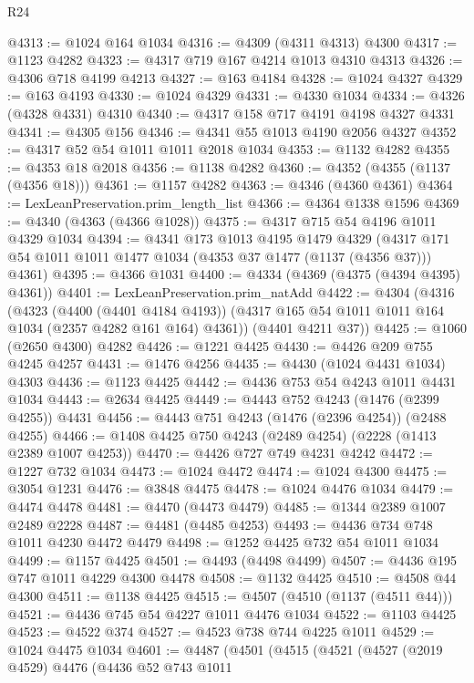 \begin{lexlean}{R24}
\begin{coremodule}
@4313 := @1024 @164 @1034
@4316 := @4309 (@4311 @4313) @4300
@4317 := @1123 @4282
@4323 := @4317 @719 @167 @4214 @1013 @4310 @4313
@4326 := @4306 @718 @4199 @4213
@4327 := @163 @4184
@4328 := @1024 @4327
@4329 := @163 @4193
@4330 := @1024 @4329
@4331 := @4330 @1034
@4334 := @4326 (@4328 @4331) @4310
@4340 := @4317 @158 @717 @4191 @4198 @4327 @4331
@4341 := @4305 @156
@4346 := @4341 @55 @1013 @4190 @2056 @4327
@4352 := @4317 @52 @54 @1011 @1011 @2018 @1034
@4353 := @1132 @4282
@4355 := @4353 @18 @2018
@4356 := @1138 @4282
@4360 := @4352 (@4355 (@1137 (@4356 @18)))
@4361 := @1157 @4282
@4363 := @4346 (@4360 @4361)
@4364 := LexLeanPreservation.prim_length_list
@4366 := @4364 @1338 @1596
@4369 := @4340 (@4363 (@4366 @1028))
@4375 := @4317 @715 @54 @4196 @1011 @4329 @1034
@4394 := @4341
    @173
    @1013
    @4195
    @1479
    @4329
    (@4317 @171 @54 @1011 @1011 @1477 @1034 (@4353 @37 @1477 (@1137 (@4356 @37))) @4361)
@4395 := @4366 @1031
@4400 := @4334 (@4369 (@4375 (@4394 @4395) @4361))
@4401 := LexLeanPreservation.prim_natAdd
@4422 := @4304
    (@4316
      (@4323
        (@4400 (@4401 @4184 @4193))
        (@4317 @165 @54 @1011 @1011 @164 @1034 (@2357 @4282 @161 @164) @4361))
      (@4401 @4211 @37))
@4425 := @1060 (@2650 @4300) @4282
@4426 := @1221 @4425
@4430 := @4426 @209 @755 @4245 @4257
@4431 := @1476 @4256
@4435 := @4430 (@1024 @4431 @1034) @4303
@4436 := @1123 @4425
@4442 := @4436 @753 @54 @4243 @1011 @4431 @1034
@4443 := @2634 @4425
@4449 := @4443 @752 @4243 (@1476 (@2399 @4255)) @4431
@4456 := @4443 @751 @4243 (@1476 (@2396 @4254)) (@2488 @4255)
@4466 := @1408 @4425 @750 @4243 (@2489 @4254) (@2228 (@1413 @2389 @1007 @4253))
@4470 := @4426 @727 @749 @4231 @4242
@4472 := @1227 @732 @1034
@4473 := @1024 @4472
@4474 := @1024 @4300
@4475 := @3054 @1231
@4476 := @3848 @4475
@4478 := @1024 @4476 @1034
@4479 := @4474 @4478
@4481 := @4470 (@4473 @4479)
@4485 := @1344 @2389 @1007 @2489 @2228
@4487 := @4481 (@4485 @4253)
@4493 := @4436 @734 @748 @1011 @4230 @4472 @4479
@4498 := @1252 @4425 @732 @54 @1011 @1034
@4499 := @1157 @4425
@4501 := @4493 (@4498 @4499)
@4507 := @4436 @195 @747 @1011 @4229 @4300 @4478
@4508 := @1132 @4425
@4510 := @4508 @44 @4300
@4511 := @1138 @4425
@4515 := @4507 (@4510 (@1137 (@4511 @44)))
@4521 := @4436 @745 @54 @4227 @1011 @4476 @1034
@4522 := @1103 @4425
@4523 := @4522 @374
@4527 := @4523 @738 @744 @4225 @1011
@4529 := @1024 @4475 @1034
@4601 := @4487
    (@4501
      (@4515
        (@4521
          (@4527
            (@2019 @4529)
            @4476
            (@4436
              @52
              @743
              @1011

\end{coremodule}
\end{lexlean}
